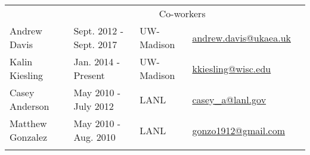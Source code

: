 \begin{longtable}{lllll}
               
				                   

              & \multicolumn{3}{c}{\Large{Co-workers}} &  \\  \vspace{2mm}

	      {Andrew Davis}\label{andy} & {Sept. 2012 - Sept. 2017} &
	      {UW-Madison} &
	      \href{mailto:andrew.davis@ukaea.uk}{andrew.davis@ukaea.uk} \\
	      \vspace{2mm}
{Kalin Kiesling}\label{kk} & {Jan. 2014 - Present} & {UW-Madison}  &
	\href{mailto:kkiesling@wisc.edu}{kkiesling@wisc.edu} \\ \vspace{2mm}  %

{Casey Anderson}\label{cas} & {May 2010 - July 2012} & {LANL}&
\href{mailto:casey\_a@lanl.com}{casey\_a@lanl.gov} \\ \vspace{2mm}%

{Matthew Gonzalez}\label{matt_gonzo} & {May 2010 - Aug. 2010} & {LANL} &
	\href{mailto:gonzo1912@gmail.com}{gonzo1912@gmail.com} \\ \vspace{2mm}%
     


\vspace{-12mm} %
\end{longtable}






%
